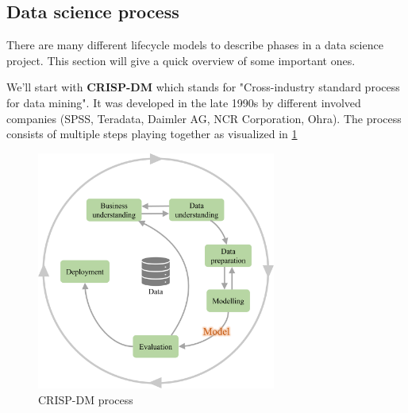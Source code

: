 
\subsection{Data science process}
There are many different lifecycle models to describe phases in a data science project. This section will give a quick overview of some important ones.

We'll start with \textbf{CRISP-DM} which stands for "Cross-industry standard process for data mining". It was developed in the late 1990s by different involved companies (SPSS, Teradata, Daimler AG, NCR Corporation, Ohra). The process consists of multiple steps playing together as visualized in \ref{fig:1_crisp_dm}

\begin{figure}[H]
  \centering
  \includegraphics[width=0.7\textwidth]{assets/basics/crisp-dm.png}
  \caption{CRISP-DM process}
  \label{fig:1_crisp_dm}
\end{figure}

